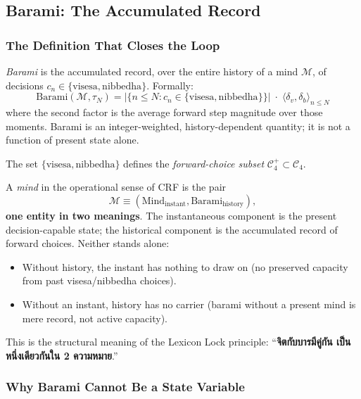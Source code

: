 \documentclass[12pt, a4paper]{article}
\begin{document}
\subsection{Barami: The Accumulated Record}

\subsubsection{The Definition That Closes the Loop}

\begin{formalbox}[title={DEF-MB04: Barami}]
\emph{Barami} is the accumulated record, over the entire history of a
mind $\mathcal{M}$, of decisions $c_n \in \{\text{visesa},
\text{nibbedha}\}$. Formally:
\[
  \mathrm{Barami}(\mathcal{M}, \tau_N) =
  \big|\{n \le N : c_n \in \{\text{visesa}, \text{nibbedha}\}\}\big|
  \;\cdot\; \langle \delta_v, \delta_b \rangle_{n \le N}
\]
where the second factor is the average forward step magnitude over
those moments. Barami is an integer-weighted, history-dependent
quantity; it is not a function of present state alone.

The set $\{\text{visesa}, \text{nibbedha}\}$ defines the
\emph{forward-choice subset}
$\mathcal{C}_4^{+} \subset \mathcal{C}_4$.
\end{formalbox}

\begin{formalbox}[title={DEF-MB05: The Mind-Barami Pairing}]
A \emph{mind} in the operational sense of CRF is the pair
\[
  \mathcal{M} \equiv (\mathrm{Mind}_{\mathrm{instant}},
  \mathrm{Barami}_{\mathrm{history}}),
\]
\textbf{one entity in two meanings}. The instantaneous component is
the present decision-capable state; the historical component is the
accumulated record of forward choices. Neither stands alone:
\begin{itemize}[leftmargin=*]
\item Without history, the instant has nothing to draw on
(no preserved capacity from past visesa/nibbedha choices).
\item Without an instant, history has no carrier
(barami without a present mind is mere record, not active capacity).
\end{itemize}
This is the structural meaning of the Lexicon Lock principle:
``\textbf{จิตกับบารมีคู่กัน เป็นหนึ่งเดียวกันใน 2 ความหมาย}.''
\end{formalbox}

\subsubsection{Why Barami Cannot Be a State Variable}
\end{document}
